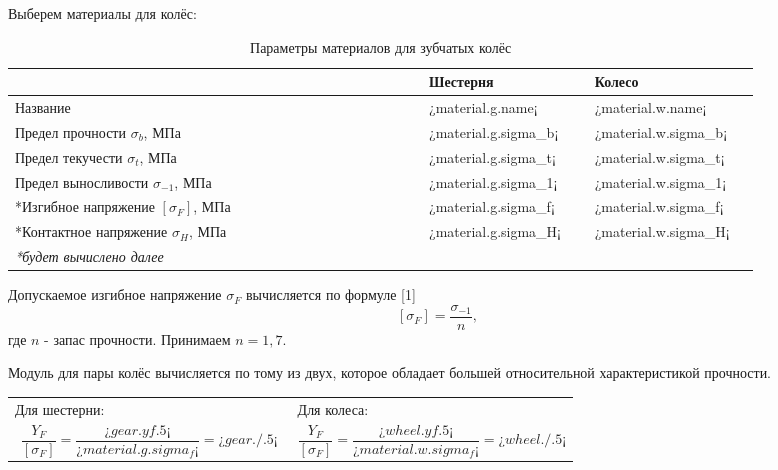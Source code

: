 \documentclass[14pt,a4paper,russian]{scrartcl}
\begin{document}
        Выберем материалы для колёс:
        \begin{table}[h!]
            \begin{center}
                \begin{tabular}{p{0.5\linewidth}p{0.2\linewidth}p{0.2\linewidth}}
                    \hline
                        & Шестерня  &   Колесо\\
                    \hline
                    Название    & ¿material.g.name¡ &   ¿material.w.name¡ \\
                    Предел прочности \( \sigma_b \), МПа  & ¿material.g.sigma_b¡ & ¿material.w.sigma_b¡ \\
                    Предел текучести \( \sigma_t \), МПа  &   ¿material.g.sigma_t¡ & ¿material.w.sigma_t¡ \\
                    Предел выносливости \( \sigma_{-1} \), МПа  & ¿material.g.sigma_1¡ & ¿material.w.sigma_1¡ \\
                    *Изгибное напряжение \( [\sigma_F] \), МПа & ¿material.g.sigma_f¡ & ¿material.w.sigma_f¡ \\
                    *Контактное напряжение \( \sigma_H \), МПа & ¿material.g.sigma_H¡ & ¿material.w.sigma_H¡ \\
                    \hline
                    \emph{*будет вычислено далее}
                \end{tabular}
                \caption{Параметры материалов для зубчатых колёс}\label{tab:gear_materials}
            \end{center}
        \end{table}

        Допускаемое изгибное напряжение \( \sigma_F \) вычисляется по формуле [1] 
        \[ [\sigma_F] = \frac{\sigma_{-1}}{n}, \]
        где \( n \) - запас прочности. Принимаем \( n=1,7 \).\par
        
        Модуль для пары колёс вычисляется по тому из двух, которое обладает
        большей относительной характеристикой прочности.

       \begin{table}[h!]
            \begin{center}
                \begin{tabular}{p{0.5\linewidth}p{0.5\linewidth}}
                    Для шестерни:  &   Для колеса:\\
                    \[ \frac{Y_F}{[\sigma_F]} = 
                        \frac{¿gear.yf.5¡}{¿material.g.sigma_f¡} = ¿gear./.5¡\] &
                    \[ \frac{Y_F}{[\sigma_F]} = 
                    \frac{¿wheel.yf.5¡}{¿material.w.sigma_f¡} = ¿wheel./.5¡ \]\\                    
                \end{tabular}
            \end{center}
        \end{table}
\end{document}
